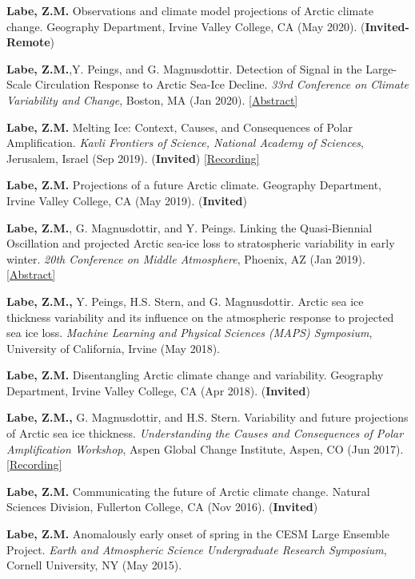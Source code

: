 \documentclass[margin,line,palatino,courier,10pt]{res}
\begin{document}
\begin{resume}
\begin{etaremune}[leftmargin=0in,topsep=0in,parsep=0in]
\item \textbf{Labe, Z.M.} Observations and climate model projections of Arctic climate change. Geography Department, Irvine Valley College, CA (May 2020). (\textbf{Invited-Remote})
\item \textbf{Labe, Z.M.},Y. Peings, and G. Magnusdottir. Detection of Signal in the Large-Scale Circulation Response to Arctic Sea-Ice Decline. \textit{33rd Conference on Climate Variability and Change}, Boston, MA (Jan 2020). \href{https://ams.confex.com/ams/2020Annual/meetingapp.cgi/Paper/367289}{[Abstract]}
\item \textbf{Labe, Z.M.} Melting Ice: Context, Causes, and Consequences of Polar Amplification. \textit{Kavli Frontiers of Science, National Academy of Sciences}, Jerusalem, Israel (Sep 2019). (\textbf{Invited}) \href{https://vimeo.com/362912204}{[Recording]}
\item \textbf{Labe, Z.M.} Projections of a future Arctic climate. Geography Department, Irvine Valley College, CA (May 2019). (\textbf{Invited})
\item \textbf{Labe, Z.M.}, G. Magnusdottir, and Y. Peings. Linking the Quasi-Biennial Oscillation and projected Arctic sea-ice loss to stratospheric variability in early winter. \textit{20th Conference on Middle Atmosphere}, Phoenix, AZ (Jan 2019). \href{https://ams.confex.com/ams/2019Annual/meetingapp.cgi/Paper/352664}{[Abstract]}
\item \textbf{Labe, Z.M.,} Y. Peings, H.S. Stern, and G. Magnusdottir. Arctic sea ice thickness variability and its influence on the atmospheric response to projected sea ice loss. \textit{Machine Learning and Physical Sciences (MAPS) Symposium}, University of California, Irvine (May 2018). 
\item \textbf{Labe, Z.M.} Disentangling Arctic climate change and variability. Geography Department, Irvine Valley College, CA (Apr 2018). (\textbf{Invited})
\item \textbf{Labe, Z.M.,} G. Magnusdottir, and H.S. Stern. Variability and future projections of Arctic sea ice thickness. \textit{Understanding the Causes and Consequences of Polar Amplification Workshop}, Aspen Global Change Institute, Aspen, CO (Jun 2017). \href{https://www.agci.org/lib/17s1/variability-and-future-projections-arctic-sea-ice-thickness}{[Recording]}
\item \textbf{Labe, Z.M.} Communicating the future of Arctic climate change. Natural Sciences Division, Fullerton College, CA (Nov 2016). (\textbf{Invited})
\item \textbf{Labe, Z.M.} Anomalously early onset of spring in the CESM Large Ensemble Project. \textit{Earth and Atmospheric Science Undergraduate Research Symposium}, Cornell University, NY (May 2015). 


\end{etaremune}
\end{resume}
\end{document}
